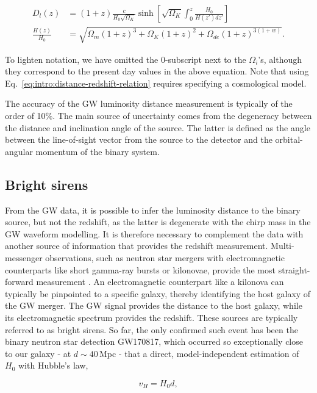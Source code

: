 \documentclass[%
preprint,
nofootinbib,
 amsmath,amssymb,
 aps,
]{revtex4-2}
\begin{document}
\begin{align}
	\label{eq:intro:distance-redshift-relation}
	D_l(z)           & = (1+z)\frac{c}{H_0 \sqrt{\Omega_{K}}} \sinh \left[ \sqrt{\Omega_{K}} \int_0^z \frac{H_0}{H(z') dz'}\right] \\
	\nonumber
	\frac{H(z)}{H_0} & = \sqrt{\Omega_m (1+z)^3 + \Omega_K (1+z)^2 + \Omega_{de} (1+z)^{3(1+w)}}.
\end{align}

To lighten notation, we have omitted the 0-subscript next to the $\Omega_i$'s, although they
correspond to the present day values in the above equation. Note that using
Eq.~\eqref{eq:intro:distance-redshift-relation} requires specifying a cosmological model.

The accuracy of the GW luminosity distance measurement is typically of the order of 10\%. The main
source of uncertainty comes from the degeneracy between the distance and inclination angle of the
source. The latter is defined as the angle between the line-of-sight vector from the source to the
detector and the orbital-angular momentum of the binary system.

\subsection{Bright sirens}

From the GW data, it is possible to infer the luminosity distance to the binary source, but not the
redshift, as the latter is degenerate with the chirp mass in the GW waveform modelling. It is
therefore necessary to complement the data with another source of information that provides the
redshift measurement. Multi-messenger observations, such as neutron star mergers with
electromagnetic counterparts like short gamma-ray bursts or kilonovae, provide the most
straight-forward measurement \cite{Holz:2005df,Dalal:2006qt}. An electromagnetic counterpart like a
kilonova can typically be pinpointed to a specific galaxy, thereby identifying the host galaxy of
the GW merger. The GW signal provides the distance to the host galaxy, while its electromagnetic
spectrum provides the redshift. These sources are typically referred to as bright sirens. So far,
the only confirmed such event has been the binary neutron star detection GW170817, which occurred
so exceptionally close to our galaxy - at $d \sim 40 \,$Mpc - that a direct, model-independent
estimation of $H_0$ with Hubble's law,

\begin{equation}
	v_H = H_0 d,
\end{equation}
\end{document}
